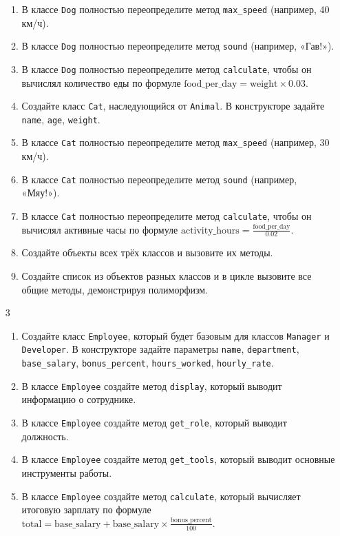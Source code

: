 \begin{enumerate}
\begin{enumerate}[leftmargin=*]
    \item В классе \texttt{Dog} полностью переопределите метод \texttt{max\_speed} (например, 40 км/ч).
    \item В классе \texttt{Dog} полностью переопределите метод \texttt{sound} (например, «Гав!»).
    \item В классе \texttt{Dog} полностью переопределите метод \texttt{calculate}, чтобы он вычислял количество еды по формуле \( \text{food\_per\_day} = \text{weight} \times 0.03 \).
    \item Создайте класс \texttt{Cat}, наследующийся от \texttt{Animal}. В конструкторе задайте \texttt{name}, \texttt{age}, \texttt{weight}.
    \item В классе \texttt{Cat} полностью переопределите метод \texttt{max\_speed} (например, 30 км/ч).
    \item В классе \texttt{Cat} полностью переопределите метод \texttt{sound} (например, «Мяу!»).
    \item В классе \texttt{Cat} полностью переопределите метод \texttt{calculate}, чтобы он вычислял активные часы по формуле \( \text{activity\_hours} = \frac{\text{food\_per\_day}}{0.02} \).
    \item Создайте объекты всех трёх классов и вызовите их методы.
    \item Создайте список из объектов разных классов и в цикле вызовите все общие методы, демонстрируя полиморфизм.
\end{enumerate}
\item[3]
\begin{enumerate}[leftmargin=*]
    \item Создайте класс \texttt{Employee}, который будет базовым для классов \texttt{Manager} и \texttt{Developer}. В конструкторе задайте параметры \texttt{name}, \texttt{department}, \texttt{base\_salary}, \texttt{bonus\_percent}, \texttt{hours\_worked}, \texttt{hourly\_rate}.
    \item В классе \texttt{Employee} создайте метод \texttt{display}, который выводит информацию о сотруднике.
    \item В классе \texttt{Employee} создайте метод \texttt{get\_role}, который выводит должность.
    \item В классе \texttt{Employee} создайте метод \texttt{get\_tools}, который выводит основные инструменты работы.
    \item В классе \texttt{Employee} создайте метод \texttt{calculate}, который вычисляет итоговую зарплату по формуле \( \text{total} = \text{base\_salary} + \text{base\_salary} \times \frac{\text{bonus\_percent}}{100} \).

\end{enumerate}
\end{enumerate}
